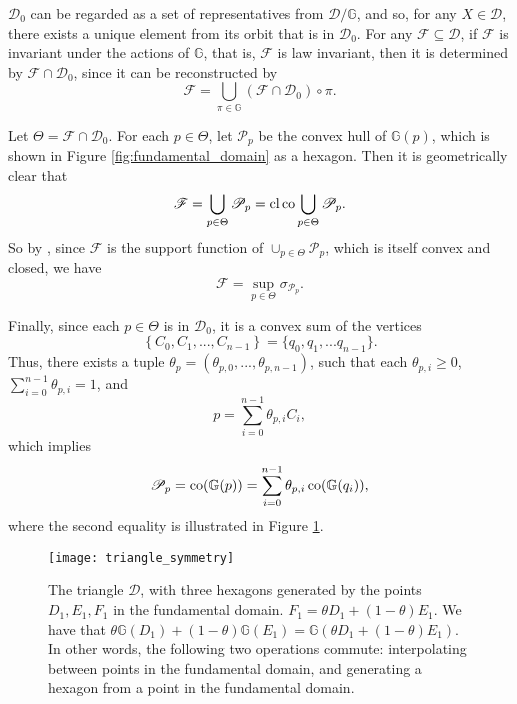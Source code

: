 \(\mathscr{D}_0\) can be regarded as a set of representatives from \(\mathscr{D}/\mathbb{G}\), and so, for any \(X\in \mathscr{D}\), there exists a unique element from its orbit that is in \(\mathscr{D}_0\). For any \(\mathscr{F}\subseteq \mathscr{D}\), if \(\mathscr{F}\) is invariant under the actions of \(\mathbb{G}\), that is, $\mathcal{F}$ is law invariant, then it is determined by \(\mathscr{F}\cap \mathscr{D}_0\), since it can be reconstructed by 
\[\mathscr{F} = \bigcup_{\pi \in \mathbb{G}} \left( \mathscr{F}\cap \mathscr{D}_0 \right) \circ \pi.\]

Let \(\Theta = \mathscr{F}\cap\mathscr{D}_0\). For each $p\in \Theta$, let $\mathscr{P}_p$ be the convex hull of $\mathbb{G}(p)$, which is shown in Figure \ref{fig:fundamental_domain} as a hexagon. Then it is geometrically clear that 
\begin{equation}
\mathscr{F} = \bigcup_{p\in \Theta} \mathscr{P}_p = \operatorname*{cl}\operatorname*{co}\bigcup_{p\in \Theta} \mathscr{P}_p.
\end{equation}
So by \cite[Table 3.3.1]{hiriart-urrutyFundamentalsConvexAnalysis2001}, since $\mathcal{F}$ is the support function of $\cup_{p\in\Theta}\mathscr{P}_p$, which is itself convex and closed, we have
\begin{equation}
\mathcal{F} = \sup_{p\in\Theta} \sigma_{\mathscr{P}_p}.
\end{equation}

Finally, since each $p\in\Theta$ is in $\mathscr{D}_0$, it is a convex sum of the vertices 
$$\left\{
C_0, C_1, ..., C_{n-1}
\right\} = \{q_0, q_1, ... q_{n-1} \}.$$
Thus, there exists a tuple $\theta_p = (\theta_{p, 0}, ..., \theta_{p, n-1})$, such that each $\theta_{p, i} \ge 0$, $\sum_{i = 0}^{n-1}\theta_{p, i} = 1$, and
$$
p = \sum_{i = 0}^{n-1}\theta_{p, i} C_i,
$$
which implies 
$$
\mathscr{P}_p = \operatorname*{co}(\mathbb{G}(p)) = \sum_{i = 0}^{n-1}\theta_{p, i}\operatorname*{co}(\mathbb{G}(q_i)),
$$
where the second equality is illustrated in Figure \ref{fig:triangle_symmetry}.

\begin{figure}[h]
	\centering
	\texttt{[image: triangle\_symmetry]}
	\caption{The triangle \(\mathscr{D}\), with three hexagons generated by the points \(D_1, E_1, F_1\) in the fundamental domain. \(F_1 = \theta D_1 + (1-\theta)E_1\). We have that \(\theta \mathbb{G}(D_1) + (1-\theta) \mathbb{G}(E_1) = \mathbb{G}(\theta D_1 + (1-\theta)E_1)\). In other words, the following two operations commute: interpolating between points in the fundamental domain, and generating a hexagon from a point in the fundamental domain.}
	\label{fig:triangle_symmetry}
\end{figure}

